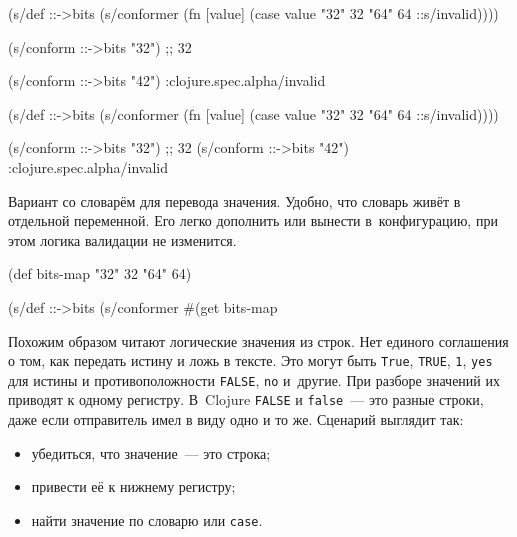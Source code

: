 
\ifx\DEVICETYPE\MOBILE

\begin{english}
  \begin{clojure}
(s/def ::->bits
  (s/conformer
   (fn [value]
     (case value
       "32" 32 "64" 64
       ::s/invalid))))

(s/conform ::->bits "32") ;; 32

(s/conform ::->bits "42")
:clojure.spec.alpha/invalid
  \end{clojure}
\end{english}

\else

\begin{english}
  \begin{clojure}
(s/def ::->bits
  (s/conformer
   (fn [value]
     (case value
       "32" 32 "64" 64
       ::s/invalid))))

(s/conform ::->bits "32") ;; 32
(s/conform ::->bits "42") :clojure.spec.alpha/invalid
  \end{clojure}
\end{english}

\fi


Вариант со словарём для перевода значения. Удобно, что словарь живёт в
отдельной переменной. Его легко дополнить или вынести в~конфигурацию, при этом
логика валидации не изменится.

\begin{english}
  \begin{clojure}
(def bits-map {"32" 32 "64" 64})

(s/def ::->bits
  (s/conformer
   #(get bits-map %
  \end{clojure}
\end{english}

Похожим образом читают логические значения из строк. Нет единого соглашения о
том, как передать истину и ложь в тексте. Это могут быть \verb|True|,
\verb|TRUE|, \verb|1|, \verb|yes| для истины и противоположности
\verb|FALSE|, \verb|no| и~другие. При разборе значений их приводят к одному
регистру. В~Clojure \verb|FALSE| и \verb|false|~--- это разные строки, даже если
отправитель имел в виду одно и то же. Сценарий выглядит так:

\begin{itemize}

\item
  убедиться, что значение~--- это строка;

\item
  привести её к нижнему регистру;

\item
  найти значение по словарю или \verb|case|.

\end{itemize}

